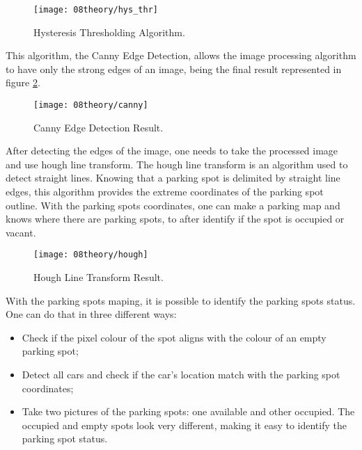 \begin{figure}[H]
	\centering
	\texttt{[image: 08theory/hys\_thr]}
	\caption{Hysteresis Thresholding Algorithm.}
	\label{fig:hys_thr}
\end{figure}

This algorithm, the Canny Edge Detection, allows the image processing algorithm to have only the strong edges of an image, being the final result represented in figure \ref{fig:canny}.

\begin{figure}[H]
	\centering
	\texttt{[image: 08theory/canny]}
	\caption{Canny Edge Detection Result.}
	\label{fig:canny}
\end{figure}




After detecting the edges of the image, one needs to take the processed image and use hough line transform. The hough line transform \cite{hough} is an algorithm used to detect straight lines. Knowing that a parking spot is delimited by straight line edges, this algorithm provides the extreme coordinates of the parking spot outline. With the parking spots coordinates, one can make a parking map and knows where there are parking spots, to after identify if the spot is occupied or vacant.

\begin{figure}[H]
	\centering
	\texttt{[image: 08theory/hough]}
	\caption{Hough Line Transform Result.}
	\label{fig:hough}
\end{figure}


With the parking spots maping, it is possible to identify the parking spots status. One can do that in three different ways:

\begin{itemize}
	\item Check if the pixel colour of the spot aligns with the colour of an empty parking spot;
	\item Detect all cars and check if the car's location match with the parking spot coordinates;
	\item Take two pictures of the parking spots: one available and other occupied. The occupied and empty spots look very different, making it easy to identify the parking spot status.
\end{itemize}


